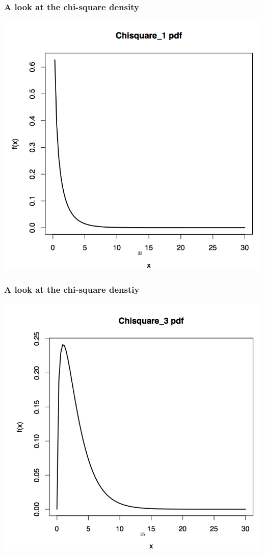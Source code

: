 \documentclass[handout]{beamer}\usepackage[]{graphicx}\usepackage[]{color}
\numberwithin{equation}{section}
\begin{document}
\begin{frame}
\frametitle{A look at the chi-square density}
 \includegraphics{../../fig/chipict1.png}
\end{frame}
\begin{frame}
\frametitle{A look at the chi-square denstiy}
 \includegraphics{../../fig/chipict2.png}
\end{frame}
\end{document}
